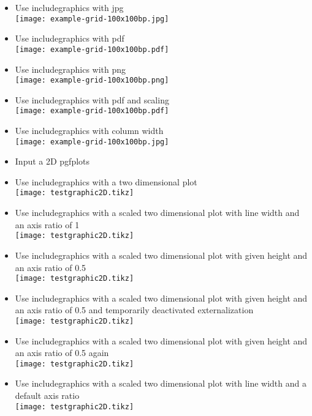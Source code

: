 \documentclass[twocolumn]{article}
\begin{document}
\begin{itemize}
			\item Use includegraphics with jpg\\%
				\texttt{[image: example-grid-100x100bp.jpg]}%
			\item Use includegraphics with pdf\\%
				\texttt{[image: example-grid-100x100bp.pdf]}%
			\item Use includegraphics with png\\%
				\texttt{[image: example-grid-100x100bp.png]}%
			\item Use includegraphics with pdf and scaling\\%
				\texttt{[image: example-grid-100x100bp.pdf]}%
			\item Use includegraphics with column width\\%
				\texttt{[image: example-grid-100x100bp.jpg]}%
			\item Input a 2D pgfplots\\
			\item Use includegraphics with a two dimensional plot\\%
				\texttt{[image: testgraphic2D.tikz]}%
			\item Use includegraphics with a scaled two dimensional plot with line width and an axis ratio of 1\\%
				\texttt{[image: testgraphic2D.tikz]}%
			\item Use includegraphics with a scaled two dimensional plot with given height and an axis ratio of 0.5\\%
				\texttt{[image: testgraphic2D.tikz]}%
			\item Use includegraphics with a scaled two dimensional plot with given height and an axis ratio of 0.5 and temporarily deactivated externalization\\%
				\tikzexternaldisable
				\texttt{[image: testgraphic2D.tikz]}%
				\tikzexternalenable
			\item Use includegraphics with a scaled two dimensional plot with given height and an axis ratio of 0.5 again\\%
				\texttt{[image: testgraphic2D.tikz]}%
			\item Use includegraphics with a scaled two dimensional plot with line width and a default axis ratio\\%
				\texttt{[image: testgraphic2D.tikz]}%

\end{itemize}
\end{document}
